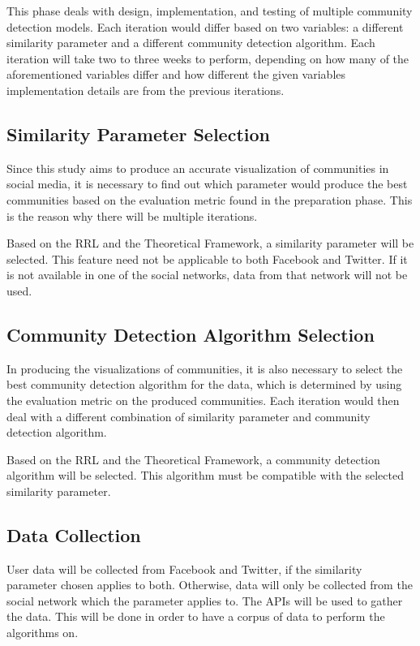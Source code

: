 This phase deals with design, implementation, and testing of multiple community detection models. Each iteration would differ based on two variables: a different similarity parameter and a different community detection algorithm. Each iteration will take two to three weeks to perform, depending on how many of the aforementioned variables differ and how different the given variable\vtick s implementation details are from the previous iteration\vtick s.

\subsection{Similarity Parameter Selection}

Since this study aims to produce an accurate visualization of communities in social media, it is necessary to find out which parameter would produce the best communities based on the evaluation metric found in the preparation phase. This is the reason why there will be multiple iterations. 

Based on the RRL and the Theoretical Framework, a similarity parameter will be selected. This feature need not be applicable to both Facebook and Twitter. If it is not available in one of the social networks, data from that network will not be used.

\subsection{Community Detection Algorithm Selection}

In producing the visualizations of communities, it is also necessary to select the best community detection algorithm for the data, which is determined by using the evaluation metric on the produced communities. Each iteration would then deal with a different combination of similarity parameter and community detection algorithm.

Based on the RRL and the Theoretical Framework, a community detection algorithm will be selected. This algorithm must be compatible with the selected similarity parameter.

\subsection{Data Collection}

User data will be collected from Facebook and Twitter, if the similarity parameter chosen applies to both. Otherwise, data will only be collected from the social network which the parameter applies to. The API\vtick s will be used to gather the data. This will be done in order to have a corpus of data to perform the algorithms on.

